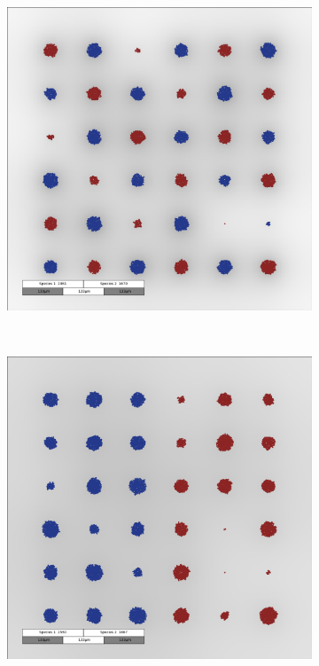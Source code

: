 \documentclass[10pt,twocolumn,5p]{elsarticle}
\numberwithin{equation}{section}
\begin{document}
\begin{figure}
\begin{subfigure}[c]{0.5\textwidth}
        \includegraphics[width=\textwidth]{Figures/abm-homogenous-low-diffusion/images/snapshot_00012000.png}
    \end{subfigure}\\
    \begin{subfigure}[c]{0.5\textwidth}
        \includegraphics[width=\textwidth]{Figures/abm-inhomogenous/images/snapshot_00012000.png}%

\end{subfigure}
\end{figure}
\end{document}
